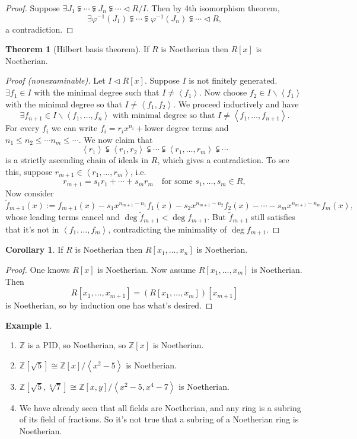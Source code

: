 \documentclass[a4paper]{article}
\newcommand{\la}{\left\langle}
\newcommand{\ra}{\right\rangle}
\newcommand{\Z}{\mathbb Z}
\theoremstyle{definition}
\newtheorem{thm}[defn]{Theorem}
\newtheorem{coro}[defn]{Corollary}
\newtheorem{example}[defn]{Example}
\begin{document}
\begin{proof}
Suppose $\exists J_1\subsetneqq \cdots \subsetneqq J_n\subsetneqq\cdots\lhd R/I$. Then by 4th isomorphism theorem,
\[
\exists \varphi^{-1}(J_1)\subsetneqq \cdots \subsetneqq \varphi^{-1}(J_n)\subsetneqq\cdots \lhd R,
\]
a contradiction.
\end{proof}
\begin{thm}[Hilbert basis theorem]
If $R$ is Noetherian then $R[x]$ is Noetherian.
\end{thm}
\begin{proof}[Proof (nonexaminable)]
Let $I\lhd R[x]$. Suppose $I$ is not finitely generated. $\exists f_1\in I$ with the minimal degree such that $I\neq \la f_1\ra$. Now choose $f_2\in I\backslash\la f_1\ra$ with the minimal degree so that $I\neq\la f_1,f_2\ra$. We proceed inductively and have
\[
\exists f_{n+1}\in I\backslash\la f_1,\ldots,f_n\ra \text{ with minimal degree so that } I\neq \la f_1,\ldots,f_{n+1}\ra.
\]
For every $f_i$ we can write $f_i=r_i x^{n_i}+$lower degree terms and $n_1\leq n_2\leq\cdots n_m\leq \cdots$. We now claim that
\[
\la r_1\ra \subsetneqq\la r_1,r_2\ra\subsetneqq\cdots\subsetneqq\la r_1,\ldots,r_m\ra \subsetneqq\cdots
\]
is a strictly ascending chain of ideals in $R$, which gives a contradiction. To see this, suppose $r_{m+1}\in\la r_1,\ldots,r_m\ra$, i.e.
\[
r_{m+1}=s_1 r_1+\cdots+s_m r_m \quad \text{for some } s_1,\ldots, s_m\in R,
\]
Now consider
\[
\widetilde f_{m+1}(x):=f_{m+1}(x)-s_1 x^{n_{m+1}-n_1} f_1(x) - s_2 x^{n_{m+1}-n_2} f_2(x) - \cdots - s_m x^{n_{m+1}-n_m} f_m(x),
\]
whose leading terms cancel and $\deg \widetilde f_{m+1}<\deg f_{m+1}$. But $\widetilde f_{m+1}$ still satisfies that it's not in $\la f_1,\ldots,f_m\ra$, contradicting the minimality of $\deg f_{m+1}$.
\end{proof}
\begin{coro}
If $R$ is Noetherian then $R[x_1,\ldots,x_n]$ is Noetherian.
\end{coro}
\begin{proof}
One knows $R[x]$ is Noetherian. Now assume $R[x_1,\ldots,x_m]$ is Noetherian. Then
\[
R[x_1,\ldots,x_{m+1}]=(R[x_1,\ldots,x_m])[x_{m+1}]
\]
is Noetherian, so by induction one has what's desired.
\end{proof}
\begin{example}
\begin{enumerate}
\item $\Z$ is a PID, so Noetherian, so $\Z[x]$ is Noetherian.
\item $\Z[\sqrt 5]\cong \Z[x]/\la x^2-5\ra$ is Noetherian.
\item $\Z[\sqrt 5,\sqrt[4] 7]\cong\Z[x,y]/\la x^2-5,x^4-7\ra$ is Noetherian.
\item We have already seen that all fields are Noetherian, and any ring is a subring of its field of fractions. So it's not true that a subring of a Noetherian ring is Noetherian.
\end{enumerate}
\end{example}
\end{document}
